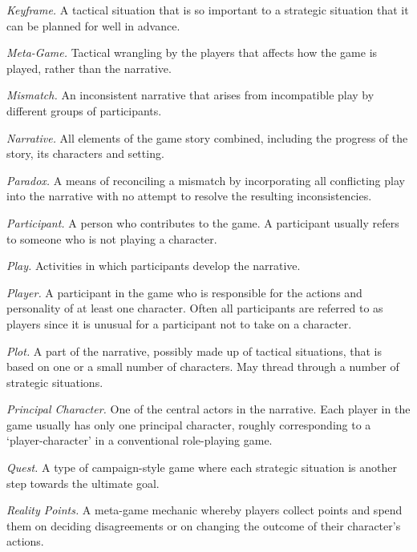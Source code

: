 \documentclass[twoside]{book}
\begin{document}
\begin{description}
\item{\it Keyframe.} A tactical situation that is so important to a strategic
situation that it can be planned for well in advance.

\item{\it Meta-Game.} Tactical wrangling by the players that affects how the game
is played, rather than the narrative.

\item{\it Mismatch.} An inconsistent narrative that arises from incompatible play
by different groups of participants.

\item{\it Narrative.} All elements of the game story combined, including the
progress of the story, its characters and setting.

\item{\it Paradox.} A means of reconciling a mismatch by incorporating all
conflicting play into the narrative with no attempt to resolve the
resulting inconsistencies.

\item{\it Participant.} A person who contributes to the game. A participant
usually refers to someone who is not playing a character.

\item{\it Play.} Activities in which participants develop the narrative.

\item{\it Player.} A participant in the game who is responsible for the actions
and personality of at least one character. Often all participants are
referred to as players since it is unusual for a participant not to
take on a character.

\item{\it Plot.} A part of the narrative, possibly made up of tactical
situations, that is based on one or a small number of characters. May
thread through a number of strategic situations.

\item{\it Principal Character.} One of the central actors in the narrative. Each
player in the game usually has only one principal character, roughly
corresponding to a `player-character' in a conventional role-playing
game.

\item{\it Quest.} A type of campaign-style game where each strategic situation is
another step towards the ultimate goal.

\item{\it Reality Points.} A meta-game mechanic whereby players collect points
and spend them on deciding disagreements or on changing the outcome of
their character's actions.


\end{description}
\end{document}
